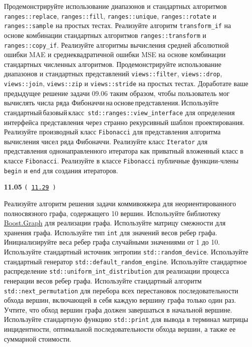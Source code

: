\documentclass[a4paper,12pt]{article}
\begin{document}
Продемонстрируйте использование диапазонов и стандартных алгоритмов \lstinline{ranges::replace}, \lstinline{ranges::fill}, \lstinline{ranges::unique}, \lstinline{ranges::rotate} и \lstinline{ranges::sample} на простых тестах. Реализуйте алгоритм \lstinline{transform_if} на основе комбинации стандартных алгоритмов \lstinline{ranges::transform} и \lstinline{ranges::copy_if}. Реализуйте алгоритмы вычисления средней абсолютной ошибки MAE и среднеквадратичной ошибки MSE на основе комбинации стандартных численных алгоритмов. Продемонстрируйте использование диапазонов и стандартных представлений \lstinline{views::filter}, \lstinline{views::drop}, \lstinline{views::join}, \lstinline{views::zip} и \lstinline{views::stride} на простых тестах. Доработате ваше предыдущее решение задачи 09.06 таким образом, чтобы пользователь мог вычислять числа ряда Фибоначчи\,на\,основе\,представления.\,Используйте\,стандартный\,базовый\,класс\, \lstinline{std::ranges::view_interface} для определения интерфейса представления через странно рекурсивный шаблон проектирования. Реализуйте производный класс \lstinline{Fibonacci} для представления алгоритма вычисления чисел ряда Фибоначчи. Реализуйте класс \lstinline{Iterator} для представления однонаправленного итератора как приватный вложенный класс в классе \lstinline{Fibonacci}. Реализуйте в классе \lstinline{Fibonacci} публичные функции-члены \lstinline{begin} и \lstinline{end} для создания итераторов.

\bigskip

{\large \textbf{11.05} \texttt{(\,\href{https://github.com/i-s-m-mipt/Education/blob/master/projects/examples/source/11.29.cpp}{11.29}\,)}}

\bigskip

Реализуйте алгоритм решения задачи коммивояжера для неориентированного полносвязного графа, содержащего 10 вершин. Используйте библиотеку \href{https://www.boost.org/doc/libs/latest/libs/graph/doc/index.html}{Boost.Graph} для реализации графа. Используйте матрицу смежности для хранения графа. Используйте тип \lstinline{int} для значений весов ребер графа. Инициализируйте веса ребер графа случайными значениями от 1 до 10. Используйте стандартный источник энтропии \lstinline{std::random_device}. Используйте стандартный генератор \lstinline{std::default_random_engine}. Используйте стандартное распределение \lstinline{std::uniform_int_distribution} для реализации процесса генерации весов ребер графа. Используйте стандартный алгоритм \lstinline{std::next_permutation} для перебора всех перестановок последовательности обхода вершин, включающей в себя каждую вершину графа только один раз. Учтите, что обход вершин графа должен завершаться в начальной вершине. Используйте стандартную функцию \lstinline{std::print} для вывода в терминал матрицы инцидентности, оптимальной последовательности обхода вершин, а также ее суммарной стоимости.
\end{document}
